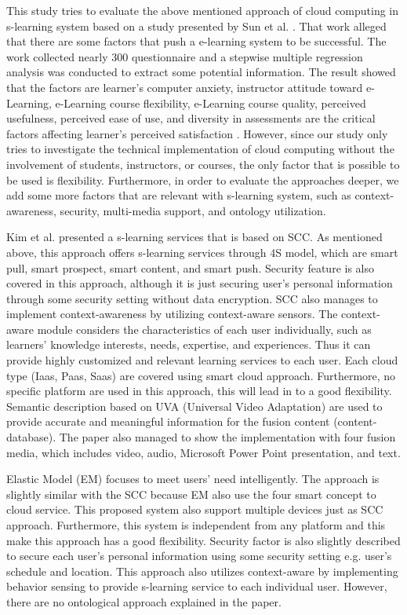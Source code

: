 \documentclass[journal]{vgtc}
\begin{document}
This study tries to evaluate the above mentioned approach of cloud computing in s-learning system based on a study presented by Sun et al. \cite{Sun2008}. That work alleged that there are some factors that push a e-learning system to be successful. The work collected nearly 300 questionnaire and a stepwise multiple regression analysis was conducted to extract some potential information. The result showed that the factors are learner's computer anxiety, instructor attitude toward e-Learning, e-Learning course flexibility, e-Learning course quality, perceived usefulness, perceived ease of use, and diversity in assessments are the critical factors affecting learner's perceived satisfaction \cite{Sun2008}. However, since our study only tries to investigate the technical implementation of cloud computing without the involvement of students, instructors, or courses, the only factor that is possible to be used is flexibility. Furthermore, in order to evaluate the approaches deeper, we add some more factors that are relevant with s-learning system, such as context-awareness, security, multi-media support, and ontology utilization.

Kim et al. presented a s-learning services that is based on SCC. As mentioned above, this approach offers s-learning services through 4S model, which are smart pull, smart prospect, smart content, and smart push. Security feature is also covered in this approach, although it is just securing user's personal information through some security setting without data encryption. SCC also manages to implement context-awareness by utilizing context-aware sensors. The context-aware module considers the characteristics of each user individually, such as learners' knowledge interests, needs, expertise, and experiences. Thus it can provide highly customized and relevant learning services to each user. Each cloud type (Iaas, Paas, Saas) are covered using smart cloud approach. Furthermore, no specific platform are used in this approach, this will lead in to a good flexibility. Semantic description based on UVA (Universal Video Adaptation) are used to provide accurate and meaningful information for the fusion content (content-database). The paper also managed to show the implementation with four fusion media, which includes video, audio, Microsoft Power Point presentation, and text.

Elastic Model (EM) \cite{Kim2013} focuses to meet users' need intelligently. The approach is slightly similar with the SCC because EM also use the four smart concept to cloud service. This proposed system also support multiple devices just as SCC approach. Furthermore, this system is independent from any platform and this make this approach has a good flexibility. Security factor is also slightly described to secure each user's personal information using some security setting e.g. user's schedule and location. This approach also utilizes context-aware by implementing behavior sensing to provide s-learning service to each individual user. However, there are no ontological approach explained in the paper. 
\end{document}
